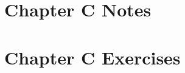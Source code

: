 \documentclass[../main.tex]{subfiles}
\begin{document}
\section{Chapter C Notes}
\newpage
\newpage
\newpage
\newpage
\newpage
\newpage

\section{Chapter C Exercises}
\newpage
\newpage
\newpage
\newpage
\newpage
\newpage
\newpage
\newpage
\end{document}
